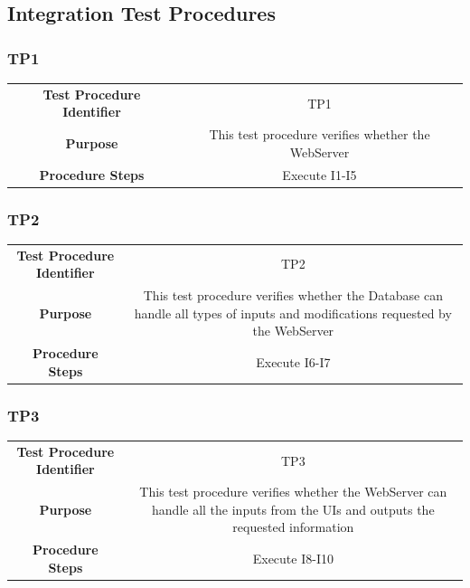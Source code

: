 \documentclass{article}
\begin{document}
\subsection{Integration Test Procedures}
\subsubsection{TP1}
\begin{adjustbox}{width=1.2\textwidth}	
	\begin{tabular}{*{2}{c}}
		\midrule
		\textbf{Test Procedure Identifier} & TP1\\
		\textbf{Purpose} & This test procedure verifies whether the WebServer\\ %
		\textbf{Procedure Steps} & Execute I1-I5\\
		\bottomrule
	\end{tabular}
\end{adjustbox}
\subsubsection{TP2}
\begin{adjustbox}{width=1.2\textwidth}	
	\begin{tabular}{*{2}{c}}
		\midrule
		\textbf{Test Procedure Identifier} & TP2\\
		\textbf{Purpose} & This test procedure verifies whether the Database can handle all types of inputs and modifications requested by the WebServer\\ 
		\textbf{Procedure Steps} & Execute I6-I7\\
		\bottomrule
	\end{tabular}
\end{adjustbox}
\subsubsection{TP3}
\begin{adjustbox}{width=1.2\textwidth}	
	\begin{tabular}{*{2}{c}}
		\midrule
		\textbf{Test Procedure Identifier} & TP3\\
		\textbf{Purpose} & This test procedure verifies whether the WebServer can handle all the inputs from the UIs and outputs the requested information\\ 
		\textbf{Procedure Steps} & Execute I8-I10\\
		\bottomrule
	\end{tabular}
\end{adjustbox}
\end{document}
